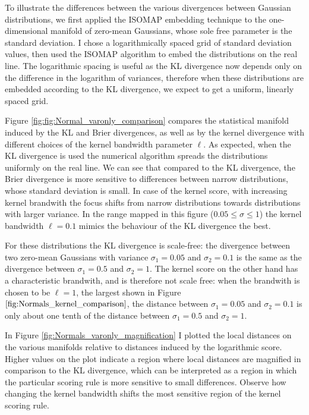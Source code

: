 To illustrate the differences between the various divergences between Gaussian distributions, we first applied the ISOMAP embedding technique to the one-dimensional manifold of zero-mean Gaussians, whose sole free parameter is the standard deviation. I chose a logarithmically spaced grid of standard deviation values, then used the ISOMAP algorithm to embed the distributions on the real line. The logarithmic spacing is useful as the KL divergence now depends only on the difference in the logarithm of variances, therefore when these distributions are embedded according to the KL divergence, we expect to get a uniform, linearly spaced grid.

Figure \ref{fig:fig:Normal_varonly_comparison} compares the statistical manifold induced by the KL and Brier divergences, as well as by the kernel divergence with different choices of the kernel bandwidth parameter $\ell$. As expected, when the KL divergence is used the numerical algorithm spreads the distributions uniformly on the real line. We can see that compared to the KL divergence, the Brier divergence is more sensitive to differences between narrow distributions, whose standard deviation is small. In case of the kernel score, with increasing kernel brandwith the focus shifts from narrow distributions towards distributions with larger variance. In the range mapped in this figure ($0.05 \leq \sigma \leq 1$) the kernel bandwidth $\ell=0.1$ mimics the behaviour of the KL divergence the best.

For these distributions the KL divergence is scale-free: the divergence between two zero-mean Gaussians with variance $\sigma_1=0.05$ and $\sigma_2 = 0.1$ is the same as the divergence between $\sigma_1=0.5$ and $\sigma_2 = 1$. The kernel score on the other hand has a characteristic brandwith, and is therefore not scale free: when the brandwith is chosen to be $\ell=1$, the largest shown in Figure $\ref{fig:Normals_kernel_comparison}$, the distance between $\sigma_1=0.05$ and $\sigma_2 = 0.1$ is only about one tenth of the distance between $\sigma_1=0.5$ and $\sigma_2 = 1$.

In Figure \ref{fig:Normals_varonly_magnification} I plotted the local distances on the various manifolds relative to distances induced by the logarithmic score. Higher values on the plot indicate a region where local distances are magnified in comparison to the KL divergence, which can be interpreted as a region in which the particular scoring rule is more sensitive to small differences. Observe how changing the kernel bandwidth shifts the most sensitive region of the kernel scoring rule.

